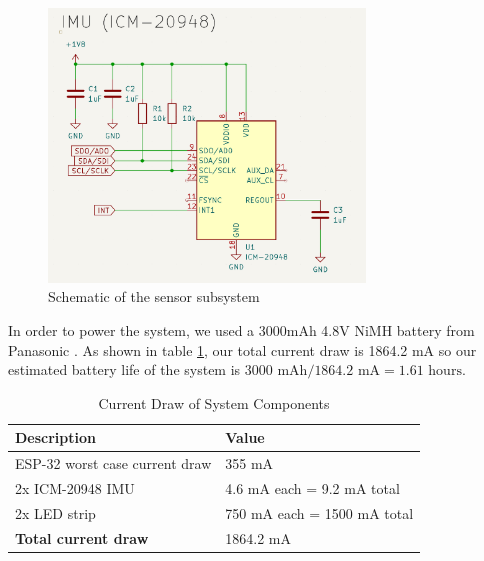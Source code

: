 \begin{figure}[ht]
    \centering
    \includegraphics[width=0.75\textwidth]{images/IMU_schematic.png}
    \caption{Schematic of the sensor subsystem}
    \label{fig:IMU_sub}
\end{figure}
In order to power the system, we used a 3000mAh 4.8V NiMH battery from Panasonic \cite{panasonic2023datasheet}. As shown in table \ref{tab:current_draw}, our total current draw is 1864.2 mA so our estimated battery life of the system is $3000 \text{ mAh} / 1864.2 \text{ mA} = 1.61 \text{ hours}$. 
\begin{table}[h]
    \centering
    \caption{Current Draw of System Components}
    \label{tab:current_draw}
    \begin{tabular}{|l|l|}
        \hline
        \textbf{Description} & \textbf{Value} \\
        \hline
        ESP-32 worst case current draw & 355 mA \\
        \hline
        2x ICM-20948 IMU & 4.6 mA each = 9.2 mA total \\
        \hline
        2x LED strip & 750 mA each = 1500 mA total \\
        \hline
        \textbf{Total current draw} & 1864.2 mA \\
        \hline
    \end{tabular}
\end{table}

